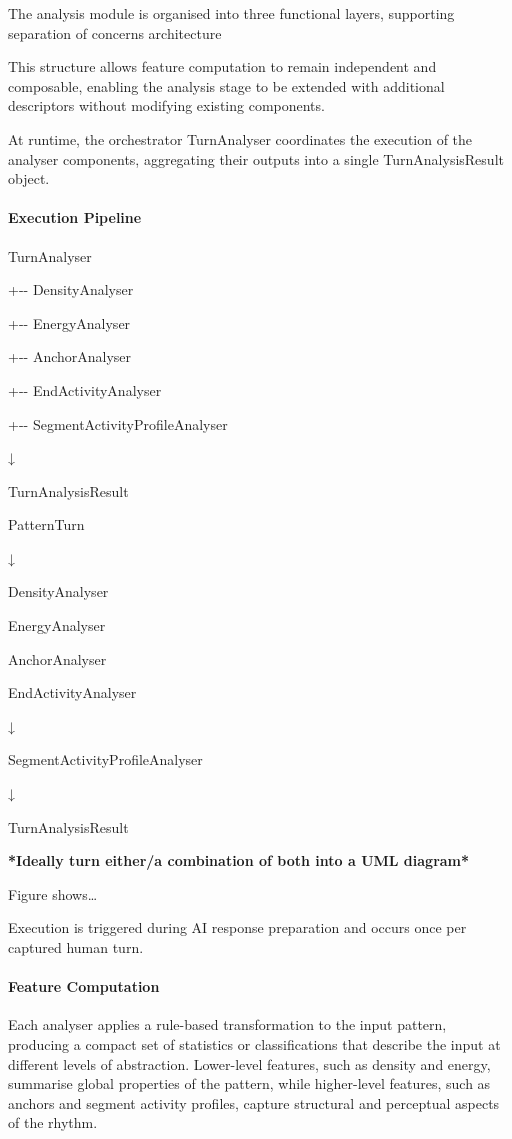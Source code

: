 The analysis module is organised into three functional layers,
supporting separation of concerns architecture

This structure allows feature computation to remain independent and
composable, enabling the analysis stage to be extended with additional
descriptors without modifying existing components.

At runtime, the orchestrator TurnAnalyser coordinates the execution of
the analyser components, aggregating their outputs into a single
TurnAnalysisResult object.

\paragraph{Execution Pipeline}\label{execution-pipeline}

TurnAnalyser

\textbar{}

+-\/- DensityAnalyser

+-\/- EnergyAnalyser

+-\/- AnchorAnalyser

+-\/- EndActivityAnalyser

+-\/- SegmentActivityProfileAnalyser

↓

TurnAnalysisResult

PatternTurn

↓

DensityAnalyser

EnergyAnalyser

AnchorAnalyser

EndActivityAnalyser

↓

SegmentActivityProfileAnalyser

↓

TurnAnalysisResult

\textbf{*Ideally turn either/a combination of both into a UML diagram*}

Figure shows\ldots{}

Execution is triggered during AI response preparation and occurs once
per captured human turn.

\paragraph{Feature Computation}\label{feature-computation}

Each analyser applies a rule-based transformation to the input pattern,
producing a compact set of statistics or classifications that describe
the input at different levels of abstraction. Lower-level features, such
as density and energy, summarise global properties of the pattern, while
higher-level features, such as anchors and segment activity profiles,
capture structural and perceptual aspects of the rhythm.

